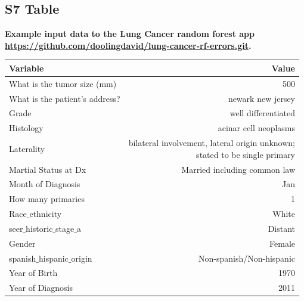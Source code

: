 \documentclass[10pt,letterpaper]{article}
\begin{document}
\subsection*{S7 Table}
\label{S7_Table}
{\bf Example input data to the Lung Cancer random forest app \url{https://github.com/doolingdavid/lung-cancer-rf-errors.git}.}
\begin{table}[H]
\begin{adjustwidth}{-2.25in}{0in} %
\begin{tabular}{lr}
\toprule
  Variable  & Value \\ 
\midrule
  What is the tumor size (mm) & 500 \\  
  What is the patient's address? & newark new jersey \\ 
  Grade & well differentiated \\  
  Histology & acinar cell neoplasms \\ 
  Laterality & \makecell{bilateral involvement, lateral origin unknown; \\ stated to be single primary} \\  
 Martial Status at Dx & Married including common law \\  
 Month of Diagnosis & Jan \\  
 How many primaries & 1 \\  
  Race$\_$ethnicity & White \\  
  seer$\_$historic$\_$stage$\_$a  & Distant \\ 
  Gender & Female \\  
  spanish$\_$hispanic$\_$origin & Non-spanish/Non-hispanic \\ 
 Year of Birth & 1970 \\  
  Year of Diagnosis & 2011 \\
\bottomrule
\end{tabular}
\label{tab:lungmaritalstatus}
\end{adjustwidth}
\end{table}
\end{document}
